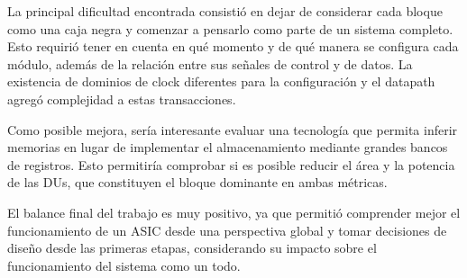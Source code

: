 \documentclass[10pt,a4paper]{article}
\begin{document}
La principal dificultad encontrada consistió en dejar de considerar cada bloque
como una caja negra y comenzar a pensarlo como parte de un sistema completo. Esto
requirió tener en cuenta en qué momento y de qué manera se configura cada módulo,
además de la relación entre sus señales de control y de datos. La existencia de
dominios de clock diferentes para la configuración y el datapath agregó
complejidad a estas transacciones.

Como posible mejora, sería interesante evaluar una tecnología que permita inferir
memorias en lugar de implementar el almacenamiento mediante grandes bancos de
registros. Esto permitiría comprobar si es posible reducir el área y la potencia
de las DUs, que constituyen el bloque dominante en ambas métricas.

El balance final del trabajo es muy positivo, ya que permitió comprender mejor el
funcionamiento de un ASIC desde una perspectiva global y tomar decisiones de
diseño desde las primeras etapas, considerando su impacto sobre el
funcionamiento del sistema como un todo.
\end{document}
